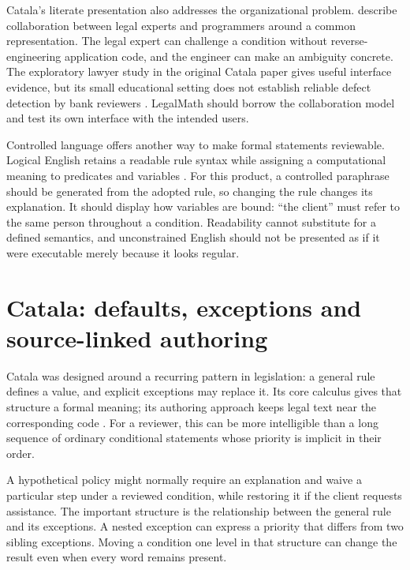 \documentclass[12pt,a4paper,oneside,openany]{book}
\begin{document}
Catala's literate presentation also addresses the organizational problem.
\citet[sec.~4.2]{huttner2022} describe collaboration between legal experts and
programmers around a common representation. The legal expert can challenge a
condition without reverse-engineering application code, and the engineer can
make an ambiguity concrete. The exploratory lawyer study in the original Catala
paper gives useful interface evidence, but its small educational setting does
not establish reliable defect detection by bank reviewers
\citep[sec.~6]{catala2021}. LegalMath should borrow the collaboration model and
test its own interface with the intended users.

Controlled language offers another way to make formal statements reviewable.
Logical English retains a readable rule syntax while assigning a computational
meaning to predicates and variables \citep{logicalenglish2023}. For this product,
a controlled paraphrase should be generated from the adopted rule, so changing
the rule changes its explanation. It should display how variables are bound:
``the client'' must refer to the same person throughout a condition. Readability
cannot substitute for a defined semantics, and unconstrained English should not
be presented as if it were executable merely because it looks regular.

\section{Catala: defaults, exceptions and source-linked authoring}
\label{merge:M04:03}

\label{sec:languages-catala}
Catala was designed around a recurring pattern in legislation: a general rule
defines a value, and explicit exceptions may replace it. Its core calculus
gives that structure a formal meaning; its authoring approach keeps legal text
near the corresponding code \citep[secs.~2--4]{catala2021}. For a reviewer,
this can be more intelligible than a long sequence of ordinary conditional
statements whose priority is implicit in their order.

A hypothetical policy might normally require an explanation and waive a
particular step under a reviewed condition, while restoring it if the client
requests assistance. The important structure is the relationship between
the general rule and its exceptions. A nested exception can express a priority
that differs from two sibling exceptions. Moving a condition one level in
that structure can change the result even when every word remains present.
\end{document}
